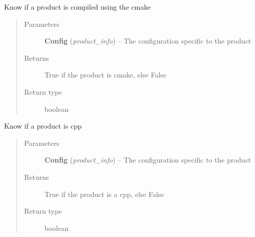 \documentclass[a4paper,10pt,english]{sphinxmanual}
\begin{document}
\begin{fulllineitems}
\label{commands/apidoc/src:src.product.product_is_cmake}
Know if a product is compiled using the cmake
\begin{quote}\begin{description}
\item[{Parameters}] \leavevmode
\textbf{Config} (\emph{product\_info}) -- The configuration specific to 
the product

\item[{Returns}] \leavevmode
True if the product is cmake, else False

\item[{Return type}] \leavevmode
boolean

\end{description}\end{quote}

\end{fulllineitems}


\begin{fulllineitems}
\label{commands/apidoc/src:src.product.product_is_cpp}
Know if a product is cpp
\begin{quote}\begin{description}
\item[{Parameters}] \leavevmode
\textbf{Config} (\emph{product\_info}) -- The configuration specific to 
the product

\item[{Returns}] \leavevmode
True if the product is a cpp, else False

\item[{Return type}] \leavevmode
boolean

\end{description}\end{quote}

\end{fulllineitems}

\end{document}
